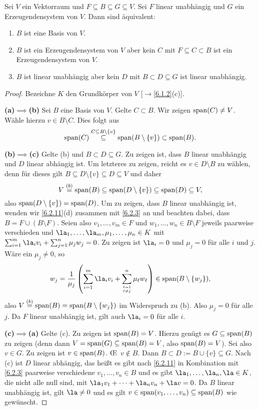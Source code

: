 \documentclass[../../main.tex]{subfiles}
\begin{document}
\begin{sat}\label{6.2.14}
Sei $V$ ein Vektorraum und $F\subseteq B\subseteq G\subseteq V$. Sei $F$ linear unabhängig und $G$ ein Erzeugendensystem von $V$.
Dann sind äquivalent:
\begin{enumerate}[\rm(a)]
\item $B$ ist eine Basis von $V$.
\item $B$ ist ein Erzeugendensystem von $V$ aber kein $C$ mit $F\subseteq C\subset B$ ist ein Erzeugendensystem von $V$.
\item $B$ ist linear unabhängig aber kein $D$ mit $B\subset D\subseteq G$ ist linear unabhängig.
\end{enumerate}
\end{sat}
\begin{proof}
Bezeichne $K$ den Grundkörper von $V$ [$\to$\ref{6.1.2}(c)].

\medskip\noindent
{\bf (a)$\implies$(b)} Sei $B$ eine Basis von $V$. Gelte $C\subset B$. Wir zeigen $\operatorname{span}(C)\ne V$. Wähle hierzu $v\in B\setminus C$. Dies folgt aus
$$\operatorname{span}(C)\overset{C\subseteq B\setminus\{v\}}\subseteq\operatorname{span}(B\setminus\{v\})\subset\operatorname{span}(B).$$

\medskip\noindent
{\bf (b)$\implies$(c)} Gelte (b) und $B\subset D\subseteq G$. Zu zeigen ist, dass $B$ linear unabhängig und $D$ linear abhängig ist. Um letzteres zu zeigen, reicht es
$v\in D\setminus B$ zu wählen, denn für dieses gilt $B\subseteq D\setminus\{v\}\subseteq D\subseteq V$ und daher
$$V\overset{(b)}=\operatorname{span}(B)\subseteq\operatorname{span}(D\setminus\{v\})\subseteq\operatorname{span}(D)\subseteq V,$$ also $\operatorname{span}(D\setminus\{v\})=\operatorname{span}(D)$. Um zu zeigen, dass $B$ linear unabhängig ist, wenden wir \ref{6.2.11}(d) zusammen mit \ref{6.2.3} an und beachten
dabei, dass $B=F\cup(B\setminus F)$. Seien also $v_1,\dots,v_m\in F$ und $w_1,\dots,w_n\in B\setminus F$ jeweils paarweise verschieden und
$\la_1,\dots,\la_m,\mu_1,\dots,\mu_n\in K$ mit $\sum_{i=1}^m\la_iv_i+\sum_{j=1}^n\mu_jw_j=0$. Zu zeigen ist $\la_i=0$ und $\mu_j=0$ für alle $i$ und $j$.
Wäre ein $\mu_j\ne0$, so
$$w_j=\frac1{\mu_j}\left(\sum_{i=1}^m\la_iv_i+\sum_{\over{\ell=1}{\ell\ne j}}^n\mu_\ell w_\ell\right)\in\lin(B\setminus\{w_j\}),$$
also $V\overset{(b)}=\operatorname{span}(B)=\operatorname{span}(B\setminus\{w_j\})$
im Widerspruch zu (b). Also $\mu_j=0$ für alle $j$. Da $F$ linear unabhängig ist, gilt auch $\la_i=0$ für alle $i$.

\medskip\noindent
{\bf (c)$\implies$(a)} Gelte (c). Zu zeigen ist $\operatorname{span}(B)=V$. Hierzu genügt es $G\subseteq\operatorname{span}(B)$ zu zeigen (denn dann $V=\operatorname{span}(G)\subseteq\operatorname{span}(B)=V$, also $\operatorname{span}(B)=V$).
Sei also $v\in G$. Zu zeigen ist $v\in\operatorname{span}(B)$. \OE\ $v\notin B$. Dann $B\subset D:=B\cup\{v\}\subseteq G$. Nach (c) ist $D$ linear abhängig, das heißt es gibt
nach \ref{6.2.11} in Kombination mit \ref{6.2.3} paarweise
verschiedene $v_1,\dots,v_n\in B$ und es gibt $\la_1,\dots,\la_n,\la\in K$, die nicht alle null sind, mit $\la_1v_1+\dots+\la_nv_n+\la v=0$. Da $B$ linear unabhängig ist, gilt $\la\ne0$
und es gilt $v\in\operatorname{span}(v_1,\dots,v_n)\subseteq\operatorname{span}(B)$ wie gewünscht.
\end{proof}
\end{document}
